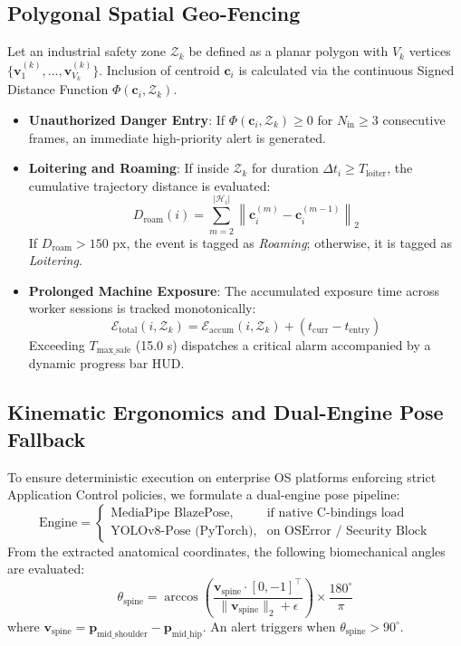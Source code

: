 \documentclass[conference]{IEEEtran}
\begin{document}
\subsection{Polygonal Spatial Geo-Fencing}
Let an industrial safety zone $\mathcal{Z}_k$ be defined as a planar polygon with $V_k$ vertices $\{\mathbf{v}_1^{(k)}, \dots, \mathbf{v}_{V_k}^{(k)}\}$. Inclusion of centroid $\mathbf{c}_i$ is calculated via the continuous Signed Distance Function $\Phi(\mathbf{c}_i, \mathcal{Z}_k)$.
\begin{itemize}
    \item \textbf{Unauthorized Danger Entry}: If $\Phi(\mathbf{c}_i, \mathcal{Z}_k) \ge 0$ for $N_{\text{in}} \ge 3$ consecutive frames, an immediate high-priority alert is generated.
    \item \textbf{Loitering and Roaming}: If inside $\mathcal{Z}_k$ for duration $\Delta t_i \ge T_{\text{loiter}}$, the cumulative trajectory distance is evaluated:
    \begin{equation}
    D_{\text{roam}}(i) = \sum_{m=2}^{|\mathcal{H}_i|} \left\| \mathbf{c}_i^{(m)} - \mathbf{c}_i^{(m-1)} \right\|_2
    \end{equation}
    If $D_{\text{roam}} > 150\text{ px}$, the event is tagged as \textit{Roaming}; otherwise, it is tagged as \textit{Loitering}.
    \item \textbf{Prolonged Machine Exposure}: The accumulated exposure time across worker sessions is tracked monotonically:
    \begin{equation}
    \mathcal{E}_{\text{total}}(i, \mathcal{Z}_k) = \mathcal{E}_{\text{accum}}(i, \mathcal{Z}_k) + \left( t_{\text{curr}} - t_{\text{entry}} \right)
    \end{equation}
    Exceeding $T_{\text{max\_safe}}$ (15.0 s) dispatches a critical alarm accompanied by a dynamic progress bar HUD.
\end{itemize}

\subsection{Kinematic Ergonomics and Dual-Engine Pose Fallback}
To ensure deterministic execution on enterprise OS platforms enforcing strict Application Control policies, we formulate a dual-engine pose pipeline:
\begin{equation}
\text{Engine} = \begin{cases}
\text{MediaPipe BlazePose}, & \text{if native C-bindings load} \\
\text{YOLOv8-Pose (PyTorch)}, & \text{on OSError / Security Block}
\end{cases}
\end{equation}
From the extracted anatomical coordinates, the following biomechanical angles are evaluated:
\begin{equation}
\theta_{\text{spine}} = \arccos \left( \frac{\mathbf{v}_{\text{spine}} \cdot [0, -1]^\top}{\|\mathbf{v}_{\text{spine}}\|_2 + \epsilon} \right) \times \frac{180^\circ}{\pi}
\end{equation}
where $\mathbf{v}_{\text{spine}} = \mathbf{p}_{\text{mid\_shoulder}} - \mathbf{p}_{\text{mid\_hip}}$. An alert triggers when $\theta_{\text{spine}} > 90^\circ$.
\end{document}
